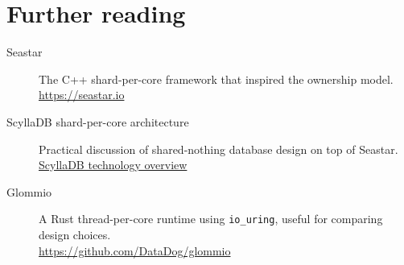 \section{Further reading}

\begin{description}
    \item[Seastar] The C++ shard-per-core framework that inspired the
        ownership model.\\
        \url{https://seastar.io}
    \item[ScyllaDB shard-per-core architecture] Practical discussion of
        shared-nothing database design on top of Seastar.\\
        \href{https://www.scylladb.com/product/technology/shard-per-core-architecture/}{ScyllaDB technology overview}
    \item[Glommio] A Rust thread-per-core runtime using \texttt{io\_uring},
        useful for comparing design choices.\\
        \url{https://github.com/DataDog/glommio}
\end{description}

